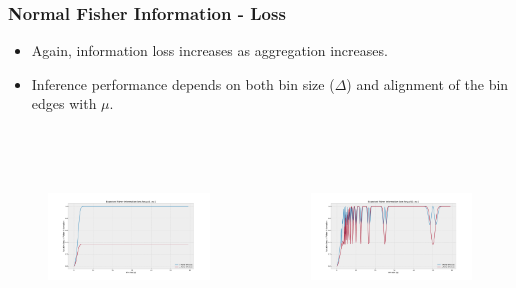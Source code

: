 \documentclass[11pt]{beamer}
\begin{document}
\begin{frame}
	\frametitle{Normal Fisher Information - Loss}
	\begin{itemize}
		\item Again, information loss increases as aggregation increases.
		\item Inference performance depends on both bin size ($\Delta$) and alignment of the bin edges with $\mu$.
	\end{itemize}
	\begin{columns}
		\begin{figure}[!h]
			\includegraphics[height=5cm, width=6cm]{mu0sig1.pdf}
			\centering
		\end{figure}
		\begin{figure}[!h]
			\includegraphics[height=5cm, width=6cm]{mu50sig1.pdf}
			\centering
		\end{figure}
	\end{columns}
\end{frame}
\end{document}
